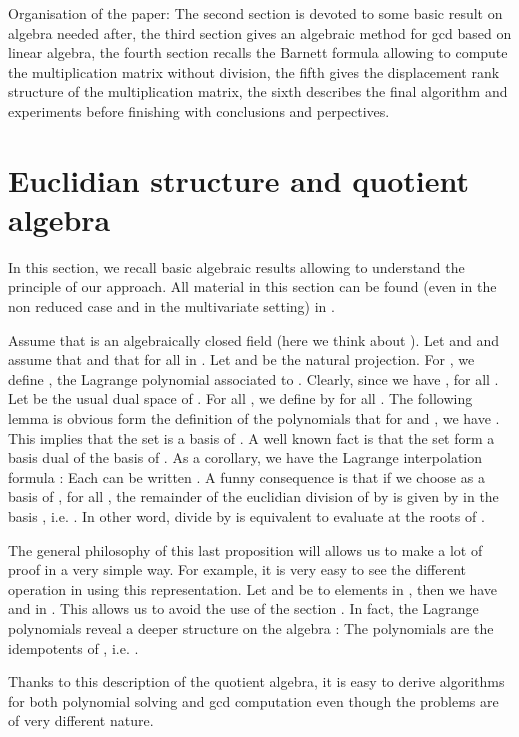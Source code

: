 \documentclass{article}
\begin{document}
Organisation of the paper: The second section is devoted to some basic result
on algebra needed after, the third section gives an algebraic method for gcd
based on linear algebra, the fourth section recalls the Barnett formula
allowing to compute the multiplication matrix without division, the fifth
gives the displacement rank structure of the multiplication matrix, the sixth
describes the final algorithm and experiments before finishing with
conclusions and perpectives.

\section{Euclidian structure and quotient algebra\label{quot}}



In this section, we recall basic algebraic results allowing to understand the
principle of our approach. All material in this section can be found (even in
the non reduced case and in the multivariate setting) in {\cite{R}}. \

Assume that  is an algebraically closed field (here we think
about ). Let  and  and assume
that  and
that  for all  in . Let
 and  be the natural projection. For , we
define , the  Lagrange polynomial
associated to . Clearly, since  we have , for all . Let
 be
the usual dual space of . For all , we
define  by
 for all . The
following lemma is obvious form the definition of the polynomials  that
for  and , we have . This implies that the set  is a
basis of . A well known fact is that the set
 form a basis
 dual of the basis  of
. As a corollary, we have the Lagrange interpolation formula :
Each  can be written . A funny
consequence is that if we choose  as a basis of
, for all , the remainder  of the
euclidian division of  by  is given by  in the basis , i.e. . In other word, divide  by 
is equivalent to evaluate  at the roots of .

The general philosophy of this last proposition will allows us to make a lot
of proof in a very simple way. For example, it is very easy to see the
different operation in  using this representation. Let  and
 be to elements in , then we have  and 
in . This allows us to avoid the use of the section . In
fact, the Lagrange polynomials  reveal a deeper structure on
the algebra  : The polynomials  are the
idempotents of , i.e. .

Thanks to this description of the quotient algebra, it is easy to derive
algorithms for both polynomial solving and gcd computation even though the
problems are of very different nature.
\end{document}
